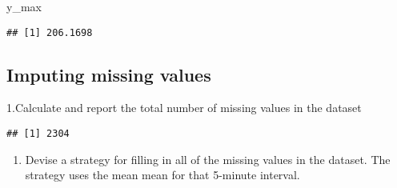 \documentclass[
]{article}
\newenvironment{Shaded}{\begin{snugshade}}{\end{snugshade}}
\newcommand{\KeywordTok}[1]{\textcolor[rgb]{0.13,0.29,0.53}{\textbf{#1}}}
\newcommand{\NormalTok}[1]{#1}
\newcommand{\OperatorTok}[1]{\textcolor[rgb]{0.81,0.36,0.00}{\textbf{#1}}}
\providecommand{\tightlist}{%
  \setlength{\itemsep}{0pt}\setlength{\parskip}{0pt}}
\begin{document}
\begin{Shaded}
\begin{Highlighting}[]
\NormalTok{y_max}
\end{Highlighting}
\end{Shaded}

\begin{verbatim}
## [1] 206.1698
\end{verbatim}

\hypertarget{imputing-missing-values}{%
\subsection{Imputing missing values}\label{imputing-missing-values}}

1.Calculate and report the total number of missing values in the dataset

\begin{Shaded}
\end{Shaded}

\begin{verbatim}
## [1] 2304
\end{verbatim}

\begin{enumerate}
\def\labelenumi{\arabic{enumi}.}
\setcounter{enumi}{1}
\tightlist
\item
  Devise a strategy for filling in all of the missing values in the
  dataset. The strategy uses the mean mean for that 5-minute interval.
\end{enumerate}
\end{document}
